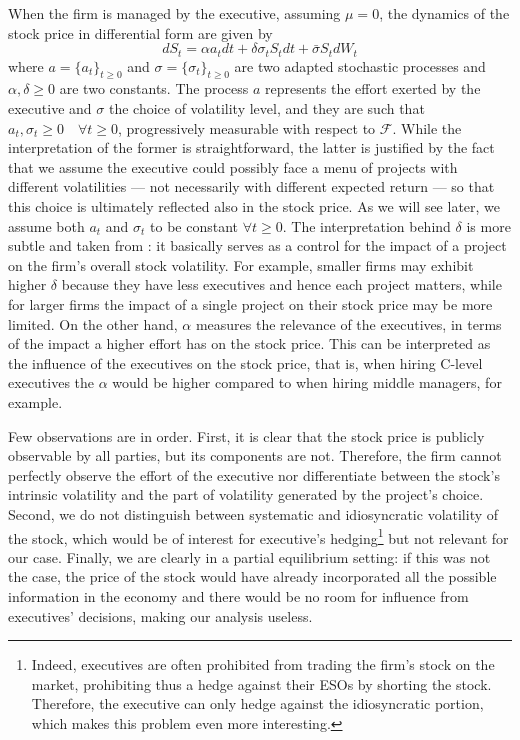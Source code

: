 When the firm is managed by the executive, assuming $\mu = 0$, the dynamics of the stock price in differential form are given by 
$$ dS_t = \alpha a_t dt + \delta \sigma_t S_t dt + \bar{\sigma} S_t dW_t $$
where $a = \{a_t\}_{t \ge 0}$ and $\sigma = \{\sigma_t\}_{t \ge 0}$ are two adapted stochastic processes and $\alpha, \delta \ge 0$ are two constants. The process $a$ represents the effort exerted by the executive and $\sigma$ the choice of volatility level, and they are such that $a_t, \sigma_t \ge 0 \quad \forall t \ge 0$, progressively measurable with respect to $\mathscr{F}$. While the interpretation of the former is straightforward, the latter is justified by the fact that we assume the executive could possibly face a menu of projects with different volatilities --- not necessarily with different expected return --- so that this choice is ultimately reflected also in the stock price. As we will see later, we assume both $a_t$ and $\sigma_t$ to be constant $\forall t\ge0$.
The interpretation behind $\delta$ is more subtle and taken from \citet{cadenillas2005executive}: it basically serves as a control for the impact of a project on the firm's overall stock volatility. For example, smaller firms may exhibit higher $\delta$ because they have less executives and hence each project matters, while for larger firms the impact of a single project on their stock price may be more limited. On the other hand, $\alpha$ measures the relevance of the executives, in terms of the impact a higher effort has on the stock price. This can be interpreted as the influence of the executives on the stock price, that is, when hiring C-level executives the $\alpha$ would be higher compared to when hiring middle managers, for example.

Few observations are in order. First, it is clear that the stock price is publicly observable by all parties, but its components are not. Therefore, the firm cannot perfectly observe the effort of the executive nor differentiate between the stock's intrinsic volatility and the part of volatility generated by the project's choice. Second, we do not distinguish between systematic and idiosyncratic volatility of the stock, which would be of interest for executive's hedging\footnote{Indeed, executives are often prohibited from trading the firm's stock on the market, prohibiting thus a hedge against their ESOs by shorting the stock. Therefore, the executive can only hedge against the idiosyncratic portion, which makes this problem even more interesting.} but not relevant for our case. Finally, we are clearly in a partial equilibrium setting: if this was not the case, the price of the stock would have already incorporated all the possible information in the economy and there would be no room for influence from executives' decisions, making our analysis useless.


